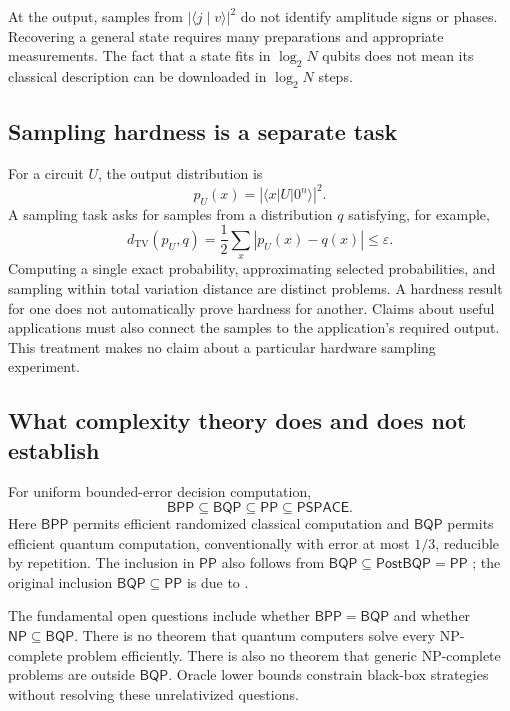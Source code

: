 \documentclass[11pt,a4paper]{article}
\newcommand{\ket}[1]{\lvert #1\rangle}
\newcommand{\bra}[1]{\langle #1\rvert}
\newcommand{\braket}[2]{\langle #1\mid #2\rangle}
\newcommand{\TV}{d_{\mathrm{TV}}}
\newcommand{\BPP}{\mathsf{BPP}}
\newcommand{\BQP}{\mathsf{BQP}}
\newcommand{\PP}{\mathsf{PP}}
\newcommand{\NP}{\mathsf{NP}}
\newcommand{\PSPACE}{\mathsf{PSPACE}}
\theoremstyle{definition}
\theoremstyle{remark}
\numberwithin{equation}{section}
\begin{document}
At the output, samples from $|\braket{j}{v}|^2$ do not identify amplitude
signs or phases. Recovering a general state requires many preparations and
appropriate measurements. The fact that a state fits in $\log_2N$ qubits
does not mean its classical description can be downloaded in $\log_2N$
steps.

\subsection{Sampling hardness is a separate task}
For a circuit $U$, the output distribution is
\begin{equation}
 p_U(x)=|\bra{x}U\ket{0^n}|^2.
\end{equation}
A sampling task asks for samples from a distribution $q$ satisfying, for
example,
\begin{equation}
 \TV(p_U,q)=\frac12\sum_x|p_U(x)-q(x)|\leq\varepsilon.
\end{equation}
Computing a single exact probability, approximating selected probabilities,
and sampling within total variation distance are distinct problems.
A hardness result for one does not automatically prove hardness for another.
Claims about useful applications must also connect the samples to the
application's required output. This treatment makes no claim about a particular
hardware sampling experiment.

\subsection{What complexity theory does and does not establish}
For uniform bounded-error decision computation,
\begin{equation}
 \BPP\subseteq\BQP\subseteq\PP\subseteq\PSPACE.
\end{equation}
Here $\BPP$ permits efficient randomized classical computation and $\BQP$
permits efficient quantum computation, conventionally with error at most
$1/3$, reducible by repetition. The inclusion in $\PP$ also follows from
$\BQP\subseteq\mathsf{PostBQP}=\PP$ \citep{aaronson2005};
the original inclusion $\BQP\subseteq\PP$ is due to \citet{adleman1997}.

The fundamental open questions include whether $\BPP=\BQP$ and whether
$\NP\subseteq\BQP$. There is no theorem that quantum computers solve every
NP-complete problem efficiently. There is also no theorem that generic
NP-complete problems are outside $\BQP$. Oracle lower bounds constrain
black-box strategies without resolving these unrelativized questions.
\end{document}
